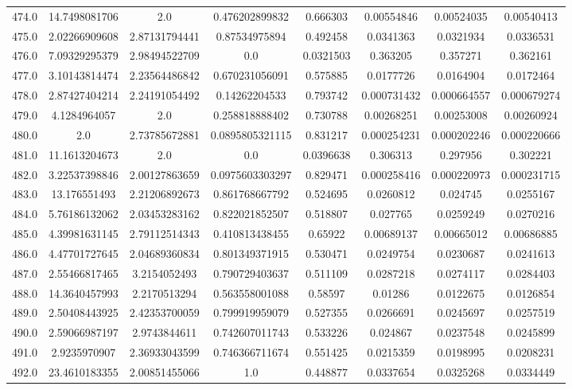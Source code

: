 \begin{longtable}{|c|c|c|c|c|c|c|c|}
474.0 & 14.7498081706 & 2.0 & 0.476202899832 & 0.666303 & 0.00554846 & 0.00524035 & 0.00540413 \\
475.0 & 2.02266909608 & 2.87131794441 & 0.87534975894 & 0.492458 & 0.0341363 & 0.0321934 & 0.0336531 \\
476.0 & 7.09329295379 & 2.98494522709 & 0.0 & 0.0321503 & 0.363205 & 0.357271 & 0.362161 \\
477.0 & 3.10143814474 & 2.23564486842 & 0.670231056091 & 0.575885 & 0.0177726 & 0.0164904 & 0.0172464 \\
478.0 & 2.87427404214 & 2.24191054492 & 0.14262204533 & 0.793742 & 0.000731432 & 0.000664557 & 0.000679274 \\
479.0 & 4.1284964057 & 2.0 & 0.258818888402 & 0.730788 & 0.00268251 & 0.00253008 & 0.00260924 \\
480.0 & 2.0 & 2.73785672881 & 0.0895805321115 & 0.831217 & 0.000254231 & 0.000202246 & 0.000220666 \\
481.0 & 11.1613204673 & 2.0 & 0.0 & 0.0396638 & 0.306313 & 0.297956 & 0.302221 \\
482.0 & 3.22537398846 & 2.00127863659 & 0.0975603303297 & 0.829471 & 0.000258416 & 0.000220973 & 0.000231715 \\
483.0 & 13.176551493 & 2.21206892673 & 0.861768667792 & 0.524695 & 0.0260812 & 0.024745 & 0.0255167 \\
484.0 & 5.76186132062 & 2.03453283162 & 0.822021852507 & 0.518807 & 0.027765 & 0.0259249 & 0.0270216 \\
485.0 & 4.39981631145 & 2.79112514343 & 0.410813438455 & 0.65922 & 0.00689137 & 0.00665012 & 0.00686885 \\
486.0 & 4.47701727645 & 2.04689360834 & 0.801349371915 & 0.530471 & 0.0249754 & 0.0230687 & 0.0241613 \\
487.0 & 2.55466817465 & 3.2154052493 & 0.790729403637 & 0.511109 & 0.0287218 & 0.0274117 & 0.0284403 \\
488.0 & 14.3640457993 & 2.2170513294 & 0.563558001088 & 0.58597 & 0.01286 & 0.0122675 & 0.0126854 \\
489.0 & 2.50408443925 & 2.42353700059 & 0.799919959079 & 0.527355 & 0.0266691 & 0.0245697 & 0.0257519 \\
490.0 & 2.59066987197 & 2.9743844611 & 0.742607011743 & 0.533226 & 0.024867 & 0.0237548 & 0.0245899 \\
491.0 & 2.9235970907 & 2.36933043599 & 0.746366711674 & 0.551425 & 0.0215359 & 0.0198995 & 0.0208231 \\
492.0 & 23.4610183355 & 2.00851455066 & 1.0 & 0.448877 & 0.0337654 & 0.0325268 & 0.0334449 \\

\end{longtable}
